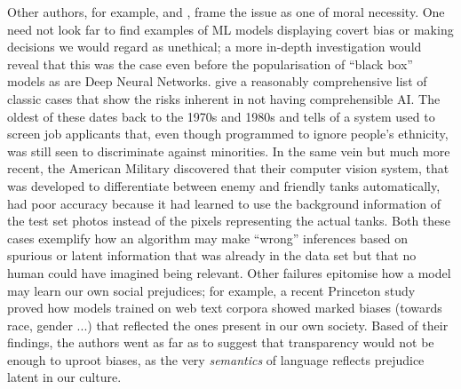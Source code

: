 Other authors, for example, \citet{doshi2017towards} and \citet{guidotti2018survey}, frame the issue as one of moral necessity.
One need not look far to find examples of ML models displaying covert bias or making decisions we would regard as unethical; a more in-depth investigation would reveal that this was the case even before the popularisation of \enquote{black box} models as are Deep Neural Networks.
\citet{guidotti2018survey} give a reasonably comprehensive list of classic cases that show the risks inherent in not having comprehensible AI.
The oldest of these dates back to the 1970s and 1980s and tells of a system used to screen job applicants that, even though programmed to ignore people's ethnicity, was still seen to discriminate against minorities.
In the same vein but much more recent, the American Military discovered that their computer vision system, that was developed to differentiate between enemy and friendly tanks automatically, had poor accuracy because it had learned to use the background information of the test set photos instead of the pixels representing the actual tanks.
Both these cases exemplify how an algorithm may make \enquote{wrong} inferences based on spurious or latent information that was already in the data set but that no human could have imagined being relevant.
Other failures epitomise how a model may learn our own social prejudices; for example, a recent Princeton study \citep{caliskan2017semantics} proved how models trained on web text corpora showed marked biases (towards race, gender ...) that reflected the ones present in our own society.
Based of their findings, the authors went as far as to suggest that transparency would not be enough to uproot biases, as the very \textit{semantics} of language reflects prejudice latent in our culture. 

